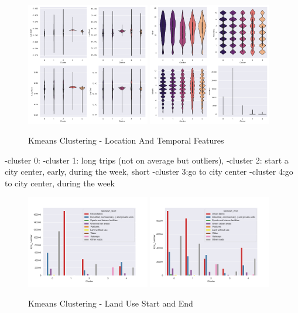 \begin{figure}[htp]
    \centering
    \includegraphics[width=0.48\textwidth]{Figures/Clustering/clusters_lat_start.png}
    \includegraphics[width=0.48\textwidth]{Figures/Clustering/clusters_hour.png}
    \caption{Kmeans Clustering - Location And Temporal Features}
    \label{fig:kmeans_loc_temp}
\end{figure}

-cluster 0: 
-cluster 1: long trips (not on average but outliers), 
-cluster 2: start a city center, early, during the week, short 
-cluster 3:go to city center
-cluster 4:go to city center, during the week

\begin{figure}[htp]
    \centering
    \includegraphics[width=0.48\textwidth]{Figures/Clustering/landuse_start.png}
    \includegraphics[width=0.48\textwidth]{Figures/Clustering/landuse_end.png}
    \caption{Kmeans Clustering - Land Use Start and End}
    \label{fig:kmeans_land_use}
\end{figure}

